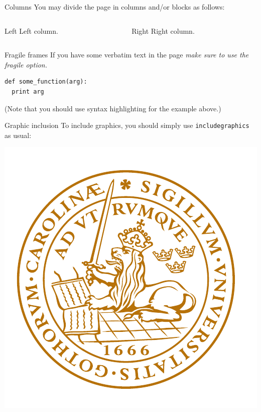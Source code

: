 \documentclass[
compress]
{beamer}
\begin{document}
\begin{frame}{Columns}
You may divide the page in columns and/or blocks as follows:
\begin{columns}
\begin{column}{.4\textwidth}
\begin{block}{Left}
Left column.
\end{block}
\end{column}
\begin{column}{.4\textwidth}
\begin{block}{Right}
Right column.
\end{block}
\end{column}
\end{columns}
\end{frame}

\begin{frame}[fragile]{Fragile frames}
If you have some verbatim text in the page \emph{make sure to use the fragile option.}
\begin{verbatim}
def some_function(arg):
  print arg
\end{verbatim}
\pause
(Note that you should use syntax highlighting for the example above.)
\end{frame}

\begin{frame}[fragile]{Graphic inclusion}
To include graphics, you should simply use \verb|includegraphics| as usual:
\begin{center}
\includegraphics[height=0.7\textheight]{logoonly}
\end{center}
\end{frame}
\end{document}
